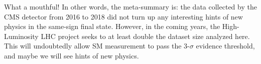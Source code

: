 What a mouthful! In other words, the meta-summary is: the data collected by
the CMS detector from 2016 to 2018 did not turn up any interesting hints of
new physics in the same-sign final state. However, in the coming years, the
High-Luminosity LHC project seeks to at least double the dataset size
analyzed here. This will undoubtedly allow SM \tttt measurement to pass the
3-$\sigma$ evidence threshold, and maybe we will see hints of new physics.

